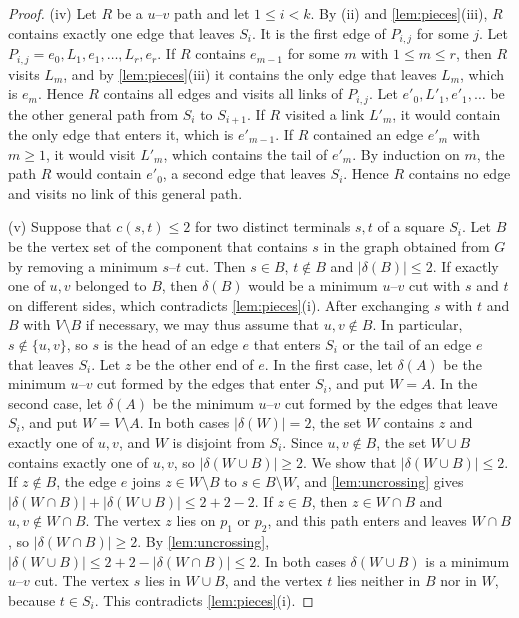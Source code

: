 \begin{proof}
(iv) Let $R$ be a $u$--$v$ path and let $1 \leq i < k$.
By (ii) and \cref{lem:pieces}(iii), $R$ contains exactly one edge that leaves $S_i$.
It is the first edge of $P_{i,j}$ for some $j$.
Let $P_{i,j} = e_0, L_1, e_1, \dots, L_r, e_r$.
If $R$ contains $e_{m-1}$ for some $m$ with $1 \leq m \leq r$, then $R$ visits $L_m$, and by \cref{lem:pieces}(iii) it contains the only edge that leaves $L_m$, which is $e_m$.
Hence $R$ contains all edges and visits all links of $P_{i,j}$.
Let $e'_0, L'_1, e'_1, \dots$ be the other general path from $S_i$ to $S_{i+1}$.
If $R$ visited a link $L'_m$, it would contain the only edge that enters it, which is $e'_{m-1}$.
If $R$ contained an edge $e'_m$ with $m \geq 1$, it would visit $L'_m$, which contains the tail of $e'_m$.
By induction on $m$, the path $R$ would contain $e'_0$, a second edge that leaves $S_i$.
Hence $R$ contains no edge and visits no link of this general path.

(v) Suppose that $c(s, t) \leq 2$ for two distinct terminals $s, t$ of a square $S_i$.
Let $B$ be the vertex set of the component that contains $s$ in the graph obtained from $G$ by removing a minimum $s$--$t$ cut.
Then $s \in B$, $t \notin B$ and $|\delta(B)| \leq 2$.
If exactly one of $u, v$ belonged to $B$, then $\delta(B)$ would be a minimum $u$--$v$ cut with $s$ and $t$ on different sides, which contradicts \cref{lem:pieces}(i).
After exchanging $s$ with $t$ and $B$ with $V \setminus B$ if necessary, we may thus assume that $u, v \notin B$.
In particular, $s \notin \{u, v\}$, so $s$ is the head of an edge $e$ that enters $S_i$ or the tail of an edge $e$ that leaves $S_i$.
Let $z$ be the other end of $e$.
In the first case, let $\delta(A)$ be the minimum $u$--$v$ cut formed by the edges that enter $S_i$, and put $W = A$.
In the second case, let $\delta(A)$ be the minimum $u$--$v$ cut formed by the edges that leave $S_i$, and put $W = V \setminus A$.
In both cases $|\delta(W)| = 2$, the set $W$ contains $z$ and exactly one of $u, v$, and $W$ is disjoint from $S_i$.
Since $u, v \notin B$, the set $W \cup B$ contains exactly one of $u, v$, so $|\delta(W \cup B)| \geq 2$.
We show that $|\delta(W \cup B)| \leq 2$.
If $z \notin B$, the edge $e$ joins $z \in W \setminus B$ to $s \in B \setminus W$, and \cref{lem:uncrossing} gives $|\delta(W \cap B)| + |\delta(W \cup B)| \leq 2 + 2 - 2$.
If $z \in B$, then $z \in W \cap B$ and $u, v \notin W \cap B$.
The vertex $z$ lies on $p_1$ or $p_2$, and this path enters and leaves $W \cap B$, so $|\delta(W \cap B)| \geq 2$.
By \cref{lem:uncrossing}, $|\delta(W \cup B)| \leq 2 + 2 - |\delta(W \cap B)| \leq 2$.
In both cases $\delta(W \cup B)$ is a minimum $u$--$v$ cut.
The vertex $s$ lies in $W \cup B$, and the vertex $t$ lies neither in $B$ nor in $W$, because $t \in S_i$.
This contradicts \cref{lem:pieces}(i).
\end{proof}

